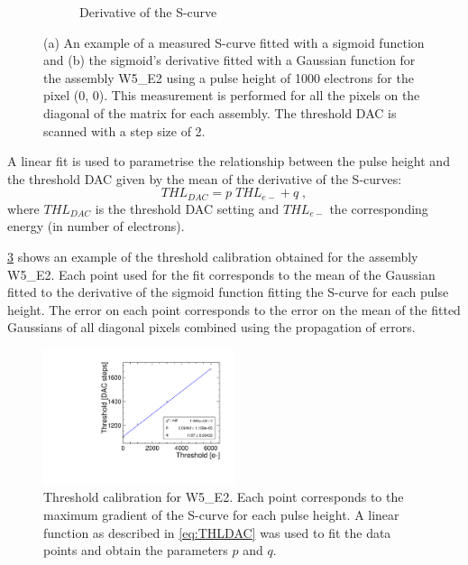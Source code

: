 \begin{figure}[htbp]
\begin{subfigure}[b]{0.45\textwidth}
    \caption{Derivative of the S-curve}
    \label{fig:deriv_example}
  \end{subfigure}
  \caption{(a) An example of a measured S-curve fitted with a sigmoid
    function and (b) the sigmoid's derivative fitted with a Gaussian
    function for the assembly W5\_E2 using a pulse height of 1000
    electrons for the pixel (0, 0). This measurement is performed for
    all the pixels on the diagonal of the matrix for each
    assembly. The threshold DAC is scanned with a step size of 2.}
  \label{fig:scurve_deriv_example}
\end{figure}

A linear fit is used to parametrise the relationship between the pulse
height and the threshold DAC given by the mean of the derivative of
the S-curves:
\begin{equation}
  THL_{DAC}=p \; THL_{e-} + q \; ,
  \label{eq:THLDAC}
\end{equation}
where $THL_{DAC}$ is the threshold DAC setting and $THL_{e-}$ the
corresponding energy (in number of electrons). 

\cref{fig:THLcalib_55-GNDGR-100} shows an example of the threshold
calibration obtained for the assembly W5\_E2. Each point used for the
fit corresponds to the mean of the Gaussian fitted to the derivative
of the sigmoid function fitting the S-curve for each pulse height. The
error on each point corresponds to the error on the mean of the fitted
Gaussians of all diagonal pixels combined using the propagation of
errors.

\begin{figure}[htbp]
  \centering
  \includegraphics[width=0.5\textwidth]{./figures/Calibration/THLcalibration_W0005_E02.pdf}
  \caption{Threshold calibration for W5\_E2. Each point corresponds to
    the maximum gradient of the S-curve for each pulse height. A
    linear function as described in \cref{eq:THLDAC} was used to fit
    the data points and obtain the parameters $p$ and $q$.}
  \label{fig:THLcalib_55-GNDGR-100}
\end{figure}

